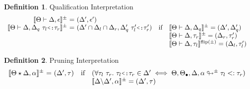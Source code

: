 \documentclass[acmsmall]{acmart}
\theoremstyle{definition}
\newtheorem{definition}{Definition}[section]
\begin{document}
\begin{definition} 
  \label{def:qualification_interpretation}
  Qualification Interpretation 
  \hfill
  \\
  \[
  \begin{array}[t]{r@{}c@{}lcl}
      \llbracket \Theta \entails \Delta, \epsilon \rrbracket^\pm
      &\ =\ & 
      (\Delta', \epsilon')
      && 

      \\

      \llbracket \Theta \entails \Delta, \Delta_q \  \tau_l \J{<:} \tau_r \rrbracket^\pm
      &\ =\ & 
      (\Delta' \cap \Delta_l \cap \Delta_r, \Delta_q' \  \tau_l' \J{<:} \tau_r')
      &\text{if}& 
      \begin{array}[t]{@{}l}
        \llbracket \Theta \entails \Delta, \Delta_q\rrbracket^\pm = (\Delta', \Delta_q')
        \\
        \llbracket \Theta \entails \Delta, \tau_r \rrbracket^\pm = (\Delta_r, \tau_r')
        \\
        \llbracket \Theta \entails \Delta, \tau_l \rrbracket^{\text{flip}(\pm)} = (\Delta_l, \tau_l')
      \end{array}
  \end{array}
  \]
\end{definition} 



\begin{definition} 
  \label{def:pruning_interpretation}
  Pruning Interpretation 
  \hfill
  \\
  \[
  \begin{array}[t]{r@{}c@{}lcl}
      \llbracket \Theta \star \Delta, \alpha \rrbracket^\pm
      &\ =\ & 
      (\Delta', \tau)
      &\text{if}& 
      \begin{array}[t]{@{}l}
        (\forall \tau_l\ \tau_r .\  \tau_l \J{<:} \tau_r \in \Delta' \iff \Theta, \Theta_\bullet, \Delta, \alpha \looparrowright^\pm \tau_l \subtypes \tau_r)
        \\
        \llbracket \Delta\backslash\Delta', \alpha \rrbracket^\pm = (\Delta', \tau)
      \end{array}

      \\
  \end{array}
  \]
\end{definition}
\end{document}
